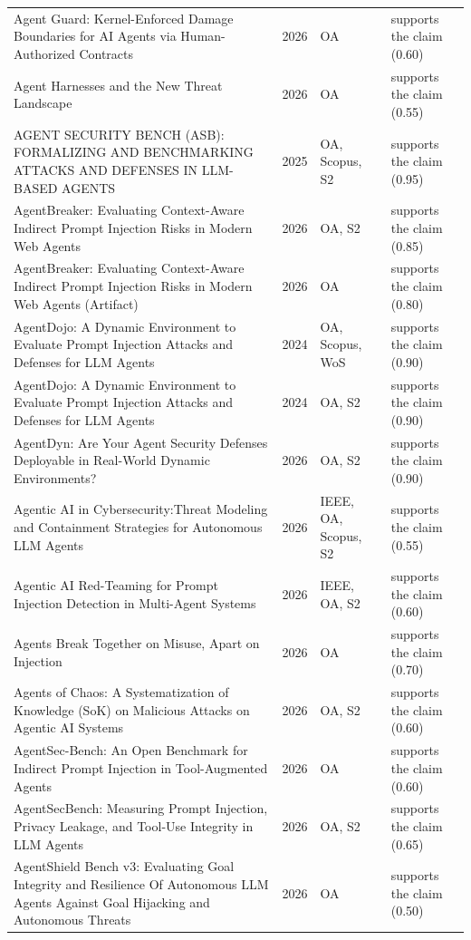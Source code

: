 \begin{longtable}{@{}%
  >{\raggedright\arraybackslash}p{}c%
  >{\raggedright\arraybackslash}p{}%
  >{\raggedright\arraybackslash}p{}@{}}
Agent Guard: Kernel-Enforced Damage Boundaries for AI Agents via Human-Authorized Contracts & 2026 & OA & supports the claim (0.60) \\
Agent Harnesses and the New Threat Landscape & 2026 & OA & supports the claim (0.55) \\
AGENT SECURITY BENCH (ASB): FORMALIZING AND BENCHMARKING ATTACKS AND DEFENSES IN LLM-BASED AGENTS & 2025 & OA, Scopus, S2 & supports the claim (0.95) \\
AgentBreaker: Evaluating Context-Aware Indirect Prompt Injection Risks in Modern Web Agents & 2026 & OA, S2 & supports the claim (0.85) \\
AgentBreaker: Evaluating Context-Aware Indirect Prompt Injection Risks in Modern Web Agents (Artifact) & 2026 & OA & supports the claim (0.80) \\
AgentDojo: A Dynamic Environment to Evaluate Prompt Injection Attacks and Defenses for LLM Agents & 2024 & OA, Scopus, WoS & supports the claim (0.90) \\
AgentDojo: A Dynamic Environment to Evaluate Prompt Injection Attacks and Defenses for LLM Agents & 2024 & OA, S2 & supports the claim (0.90) \\
AgentDyn: Are Your Agent Security Defenses Deployable in Real-World Dynamic Environments? & 2026 & OA, S2 & supports the claim (0.90) \\
Agentic AI in Cybersecurity:Threat Modeling and Containment Strategies for Autonomous LLM Agents & 2026 & IEEE, OA, Scopus, S2 & supports the claim (0.55) \\
Agentic AI Red-Teaming for Prompt Injection Detection in Multi-Agent Systems & 2026 & IEEE, OA, S2 & supports the claim (0.60) \\
Agents Break Together on Misuse, Apart on Injection & 2026 & OA & supports the claim (0.70) \\
Agents of Chaos: A Systematization of Knowledge (SoK) on Malicious Attacks on Agentic AI Systems & 2026 & OA, S2 & supports the claim (0.60) \\
AgentSec-Bench: An Open Benchmark for Indirect Prompt Injection in Tool-Augmented Agents & 2026 & OA & supports the claim (0.60) \\
AgentSecBench: Measuring Prompt Injection, Privacy Leakage, and Tool-Use Integrity in LLM Agents & 2026 & OA, S2 & supports the claim (0.65) \\
AgentShield Bench v3: Evaluating Goal Integrity and Resilience Of Autonomous LLM Agents Against Goal Hijacking and Autonomous Threats & 2026 & OA & supports the claim (0.50) \\

\end{longtable}
